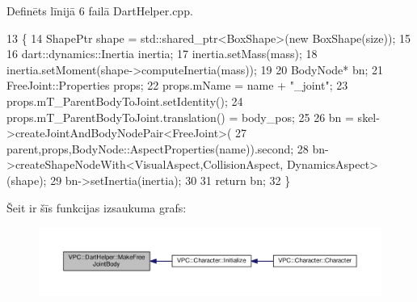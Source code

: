 Definēts līnijā 6 failā Dart\+Helper.\+cpp.


\begin{DoxyCode}
13 \{
14     ShapePtr shape = std::shared\_ptr<BoxShape>(\textcolor{keyword}{new} BoxShape(size));
15 
16     dart::dynamics::Inertia inertia;
17     inertia.setMass(mass);
18     inertia.setMoment(shape->computeInertia(mass));
19 
20     BodyNode* bn;
21     FreeJoint::Properties props;
22     props.mName = name + \textcolor{stringliteral}{"\_joint"};
23     props.mT\_ParentBodyToJoint.setIdentity();
24     props.mT\_ParentBodyToJoint.translation() = body\_pos;
25 
26     bn = skel->createJointAndBodyNodePair<FreeJoint>(
27         parent,props,BodyNode::AspectProperties(name)).second;
28     bn->createShapeNodeWith<VisualAspect,CollisionAspect, DynamicsAspect>(shape);
29     bn->setInertia(inertia);
30 
31     \textcolor{keywordflow}{return} bn;
32 \}
\end{DoxyCode}


Šeit ir šīs funkcijas izsaukuma grafs\+:
\nopagebreak
\begin{figure}[H]
\begin{center}
\leavevmode
\includegraphics[width=350pt]{namespace_v_p_c_1_1_dart_helper_a69fa7c63ad96f84bb86411e438a73d48_icgraph}
\end{center}
\end{figure}


